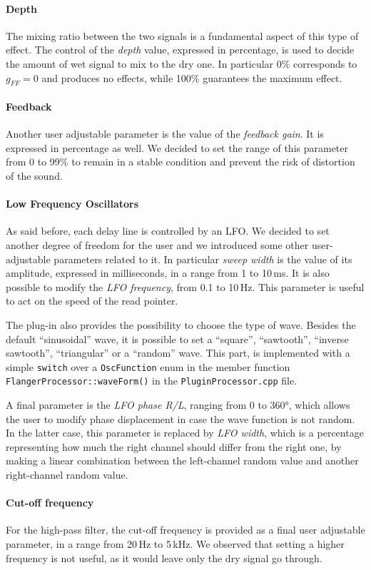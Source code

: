 \paragraph{Depth}
The mixing ratio between the two signals is a fundamental aspect of this type of effect. The control of the \emph{depth} value, expressed in percentage, is used to decide the amount of wet signal to mix to the dry one. In particular 0\% corresponds to $g_{FF} = 0$ and produces no effects, while 100\% guarantees the maximum effect.

\paragraph{Feedback}
Another user adjustable parameter is the value of the \emph{feedback gain}. It is expressed in percentage as well.
We decided to set the range of this parameter from 0 to 99\% to remain in a stable condition and prevent the risk of distortion of the sound.

\paragraph{Low Frequency Oscillators}
As said before, each delay line is controlled by an LFO.
We decided to set another degree of freedom for the user and we introduced some other user-adjustable parameters related to it.
In particular \emph{sweep width} is the value of its amplitude, expressed in milliseconds, in a range from 1 to 10\,ms.
It is also possible to modify the \emph{LFO frequency}, from 0.1 to 10\,Hz.
This parameter is useful to act on the speed of the read pointer.

The plug-in also provides the possibility to choose the type of wave.
Besides the default ``sinusoidal'' wave, it is possible to set a ``square'', ``sawtooth'', ``inverse sawtooth'', ``triangular'' or a ``random'' wave.
This part, is implemented with a simple \texttt{switch} over a \texttt{OscFunction} enum in the member function \texttt{FlangerProcessor::waveForm()} in the \texttt{PluginProcessor.cpp} file.

A final parameter is the \emph{LFO phase R/L}, ranging from 0 to 360°, which allows the user to modify phase displacement in case the wave function is not random. In the latter case, this parameter is replaced by \emph{LFO width}, which is a percentage representing how much the right channel should differ from the right one, by making a linear combination between the left-channel random value and another right-channel random value.

\paragraph{Cut-off frequency}
For the high-pass filter, the cut-off frequency is provided as a final user adjustable parameter, in a range from 20\,Hz to 5\,kHz. We observed that setting a higher frequency is not useful, as it would leave only the dry signal go through.